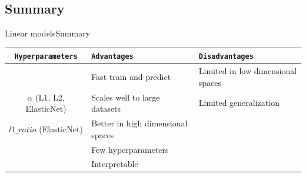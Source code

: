 \documentclass[10pt,compress]{beamer} %
\begin{document}
\subsection{Summary}
\begin{frame}{Linear models}{Summary}
	\begin{center}
	\begin{tabular}{cp{3cm}p{3cm}}\hline
	 	\texttt{Hyperparameters}  & \texttt{Advantages}  & \texttt{Disadvantages} \\\hline
	 	                          & Fast train and predict        & Limited in low dimensional spaces  \\
	 	 $\alpha$ (L1, L2, ElasticNet) & Scales well to large datasets & Limited generalization  \\
	 	 $l1\_ratio$ (ElasticNet) & Better in high dimensional spaces  &   \\
	 	                          & Few hyperparameters           &   \\
	 	                          & Interpretable                 &   \\
	 	\hline
	\end{tabular}
    \end{center}


\end{frame}
\end{document}
